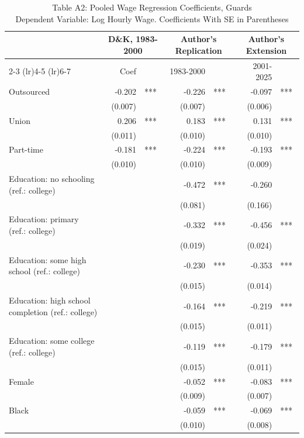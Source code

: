 \begin{table}[!t]
\caption*{
{\large Table A2: Pooled Wage Regression Coefficients, Guards} \\
{\small Dependent Variable: Log Hourly Wage. Coefficients With SE in Parentheses}
} 

\fontsize{10.0pt}{12.0pt}\selectfont

\centering\begin{tabular}{l|rlrl|rl}
\toprule
  & \multicolumn{2}{c}{D\&K, 1983-2000} & \multicolumn{2}{c}{Author's Replication} & \multicolumn{2}{c}{Author's Extension} \\ 
\cmidrule(lr){2-3} \cmidrule(lr){4-5} \cmidrule(lr){6-7}
  & Coef &  & 1983-2000 &  & 2001-2025 &  \\ 
\midrule\addlinespace[2.5pt]
Outsourced & -0.202 & *** & -0.226 & *** & -0.097 & *** \\
 & (0.007) &  & (0.007) &  & (0.006) &  \\
Union & 0.206 & *** & 0.183 & *** & 0.131 & *** \\
 & (0.011) &  & (0.010) &  & (0.010) &  \\
Part-time & -0.181 & *** & -0.224 & *** & -0.193 & *** \\
 & (0.010) &  & (0.010) &  & (0.009) &  \\
Education: no schooling (ref.: college) &  &  & -0.472 & *** & -0.260 &  \\
 &  &  & (0.081) &  & (0.166) &  \\
Education: primary (ref.: college) &  &  & -0.332 & *** & -0.456 & *** \\
 &  &  & (0.019) &  & (0.024) &  \\
Education: some high school (ref.: college) &  &  & -0.230 & *** & -0.353 & *** \\
 &  &  & (0.015) &  & (0.014) &  \\
Education: high school completion (ref.: college) &  &  & -0.164 & *** & -0.219 & *** \\
 &  &  & (0.015) &  & (0.011) &  \\
Education: some college (ref.: college) &  &  & -0.119 & *** & -0.179 & *** \\
 &  &  & (0.015) &  & (0.011) &  \\
Female &  &  & -0.052 & *** & -0.083 & *** \\
 &  &  & (0.009) &  & (0.007) &  \\
Black &  &  & -0.059 & *** & -0.069 & *** \\
 &  &  & (0.010) &  & (0.008) &  \\

\end{tabular}
\end{table}
